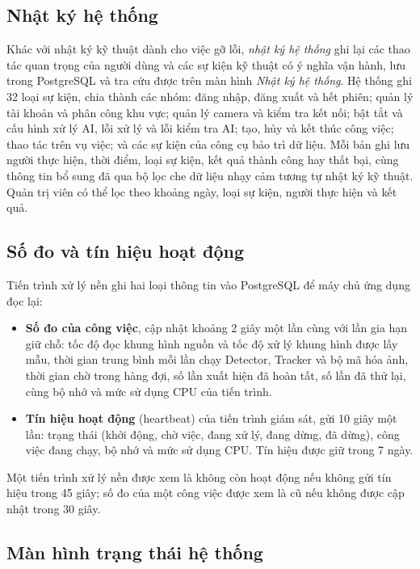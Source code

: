 \subsection{Nhật ký hệ thống}
\label{sec:6.4.2}

Khác với nhật ký kỹ thuật dành cho việc gỡ lỗi, \emph{nhật ký hệ thống} ghi lại các thao tác quan trọng của người dùng và các sự kiện kỹ thuật có ý nghĩa vận hành, lưu trong PostgreSQL và tra cứu được trên màn hình \emph{Nhật ký hệ thống}. Hệ thống ghi 32 loại sự kiện, chia thành các nhóm: đăng nhập, đăng xuất và hết phiên; quản lý tài khoản và phân công khu vực; quản lý camera và kiểm tra kết nối; bật tắt và cấu hình xử lý AI, lỗi xử lý và lỗi kiểm tra AI; tạo, hủy và kết thúc công việc; thao tác trên vụ việc; và các sự kiện của công cụ bảo trì dữ liệu. Mỗi bản ghi lưu người thực hiện, thời điểm, loại sự kiện, kết quả thành công hay thất bại, cùng thông tin bổ sung đã qua bộ lọc che dữ liệu nhạy cảm tương tự nhật ký kỹ thuật. Quản trị viên có thể lọc theo khoảng ngày, loại sự kiện, người thực hiện và kết quả.

\subsection{Số đo và tín hiệu hoạt động}
\label{sec:6.4.3}

Tiến trình xử lý nền ghi hai loại thông tin vào PostgreSQL để máy chủ ứng dụng đọc lại:
\begin{itemize}
    \item \textbf{Số đo của công việc}, cập nhật khoảng 2 giây một lần cùng với lần gia hạn giữ chỗ: tốc độ đọc khung hình nguồn và tốc độ xử lý khung hình được lấy mẫu, thời gian trung bình mỗi lần chạy Detector, Tracker và bộ mã hóa ảnh, thời gian chờ trong hàng đợi, số lần xuất hiện đã hoàn tất, số lần đã thử lại, cùng bộ nhớ và mức sử dụng CPU của tiến trình.
    \item \textbf{Tín hiệu hoạt động} (heartbeat) của tiến trình giám sát, gửi 10 giây một lần: trạng thái (khởi động, chờ việc, đang xử lý, đang dừng, đã dừng), công việc đang chạy, bộ nhớ và mức sử dụng CPU. Tín hiệu được giữ trong 7 ngày.
\end{itemize}
Một tiến trình xử lý nền được xem là không còn hoạt động nếu không gửi tín hiệu trong 45 giây; số đo của một công việc được xem là cũ nếu không được cập nhật trong 30 giây.

\subsection{Màn hình trạng thái hệ thống}
\label{sec:6.4.4}

